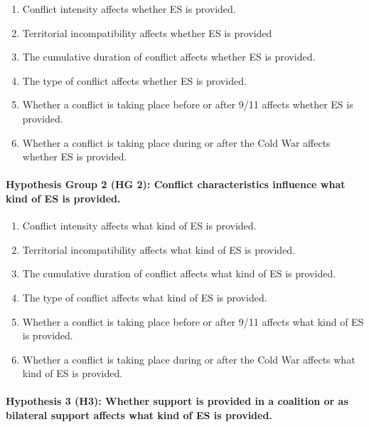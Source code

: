 \documentclass[
]{article}
\providecommand{\tightlist}{%
  \setlength{\itemsep}{0pt}\setlength{\parskip}{0pt}}
\begin{document}
\begin{enumerate}
\def\labelenumi{\alph{enumi})}
\tightlist
\item
  Conflict intensity affects whether ES is provided.
\item
  Territorial incompatibility affects whether ES is provided
\item
  The cumulative duration of conflict affects whether ES is provided.
\item
  The type of conflict affects whether ES is provided.
\item
  Whether a conflict is taking place before or after 9/11 affects
  whether ES is provided.
\item
  Whether a conflict is taking place during or after the Cold War
  affects whether ES is provided.
\end{enumerate}

\paragraph{Hypothesis Group 2 (HG 2): Conflict characteristics influence
what kind of ES is
provided.}\label{hypothesis-group-2-hg-2-conflict-characteristics-influence-what-kind-of-es-is-provided.}

\begin{enumerate}
\def\labelenumi{\alph{enumi})}
\tightlist
\item
  Conflict intensity affects what kind of ES is provided.
\item
  Territorial incompatibility affects what kind of ES is provided.
\item
  The cumulative duration of conflict affects what kind of ES is
  provided.
\item
  The type of conflict affects what kind of ES is provided.
\item
  Whether a conflict is taking place before or after 9/11 affects what
  kind of ES is provided.
\item
  Whether a conflict is taking place during or after the Cold War
  affects what kind of ES is provided.
\end{enumerate}

\paragraph{Hypothesis 3 (H3): Whether support is provided in a coalition
or as bilateral support affects what kind of ES is
provided.}\label{hypothesis-3-h3-whether-support-is-provided-in-a-coalition-or-as-bilateral-support-affects-what-kind-of-es-is-provided.}
\end{document}
